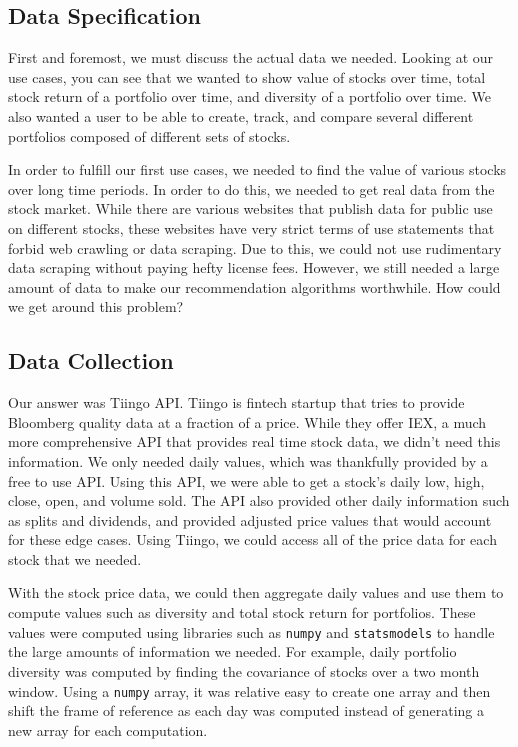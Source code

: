 \documentclass{article}
\begin{document}
\subsection{Data Specification}
First and foremost, we must discuss the actual data we needed.  Looking at our use cases, you can see that we wanted to show value of stocks over time, total stock return of a portfolio over time, and diversity of a portfolio over time.  We also wanted a user to be able to create, track, and compare several different portfolios composed of different sets of stocks.  

In order to fulfill our first use cases, we needed to find the value of various stocks over long time periods.  In order to do this, we needed to get real data from the stock market.  While there are various websites that publish data for public use on different stocks, these websites have very strict terms of use statements that forbid web crawling or data scraping.  Due to this, we could not use rudimentary data scraping without paying hefty license fees.  However, we still needed a large amount of data to make our recommendation algorithms worthwhile.  How could we get around this problem?

\subsection{Data Collection}
Our answer was Tiingo API.  Tiingo is fintech startup that tries to provide Bloomberg quality data at a fraction of a price.  While they offer IEX, a much more comprehensive API that provides real time stock data, we didn’t need this information.  We only needed daily values, which was thankfully provided by a free to use API.  Using this API, we were able to get a stock’s daily low, high, close, open, and volume sold. The API also provided other daily information such as splits and dividends, and provided adjusted price values that would account for these edge cases. Using Tiingo, we could access all of the price data for each stock that we needed.

With the stock price data, we could then aggregate daily values and use them to compute values such as diversity and total stock return for portfolios.  These values were computed using libraries such as \texttt{numpy} and \texttt{statsmodels} to handle the large amounts of information we needed.  For example, daily portfolio diversity was computed by finding the covariance of stocks over a two month window.  Using a \texttt{numpy} array, it was relative easy to create one array and then shift the frame of reference as each day was computed instead of generating a new array for each computation.
\end{document}
